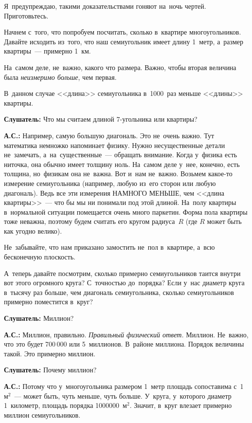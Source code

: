 Я~предупреждаю, такими доказательствами гоняют на~ночь чертей. Приготовьтесь.

Начнем с~того, что попробуем посчитать, сколько в~квартире многоугольников. Давайте исходить
из~того, что наш семиугольник имеет длину 1~метр, а~размер квартиры~--- примерно 1~км.



На~самом деле, не~важно, какого что размера. Важно, чтобы вторая величина была \textit{неизмеримо больше},
чем первая.

В~данном случае <<длина>> семиугольника в~1000~раз меньше <<длины>> квартиры.

\textbf{Слушатель:} Что мы считаем длиной 7-угольника или квартиры?

\textbf{А.С.:} Например, самую большую диагональ. Это не~очень важно. Тут математика немножко
напоминает физику. Нужно несущественные детали не~замечать, а~на~существенные~--- обращать
внимание. Когда у~физика есть ниточка, она обычно имеет толщину ноль. На~самом деле у~нее, конечно,
есть толщина, но~физикам она не~важна. Вот и~нам не~важно. Возьмем какое-то измерение семиугольника
(например, любую из~его сторон или любую диагональ). Ведь все эти измерения НАМНОГО МЕНЬШЕ, чем
<<длина квартиры>>~--- что бы мы ни понимали под этой длиной. На~полу квартиры в~нормальной ситуации
помещается очень много паркетин. Форма пола квартиры тоже неважна, поэтому будем считать его кругом
радиуса~$R$ (где $R$ может быть как угодно велико).

Не~забывайте, что нам приказано замостить не~пол в~квартире, а~всю бесконечную плоскость.

А~теперь давайте посмотрим, сколько примерно семиугольников таится внутри вот этого огромного
круга? С~точностью до~порядка? Если у~нас диаметр круга в~тысячу раз больше, чем диагональ
семиугольника, сколько семиугольников примерно поместится в~круг?

\textbf{Слушатель:} Миллион?

\textbf{А.С.:} Миллион, правильно. \textit{Правильный физический ответ.} Миллион. Не~важно, что это будет
700\,000 или 5~миллионов. В~районе миллиона. Порядок величины такой. Это примерно миллион.

\textbf{Слушатель:} Почему миллион?

\textbf{А.С.:} Потому что у~многоугольника размером 1~метр площадь сопоставима с~1~$\text{м}^{2}$~--- может
быть, чуть меньше, чуть больше.
 У~круга, у~которого диаметр 1~километр, площадь порядка 1000000~$\text{м}^{2}$.
Значит, в~круг влезает примерно миллион семиугольников.

